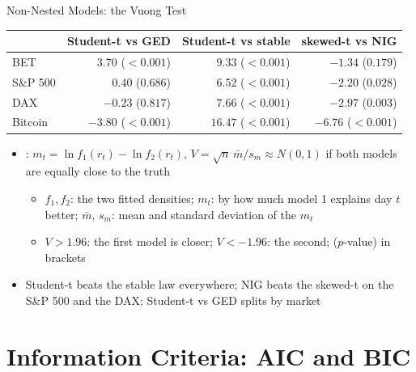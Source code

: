 \begin{frame}{Non-Nested Models: the Vuong Test}
\itemsize{\footnotesize}
\begin{center}
\footnotesize
\begin{tabular}{lrrr}
\toprule
& Student-t vs GED & Student-t vs stable & skewed-t vs NIG \\
\midrule
BET & $3.70$ ($<0.001$) & $9.33$ ($<0.001$) & $-1.34$ ($0.179$) \\
S\&P 500 & $0.40$ ($0.686$) & $6.52$ ($<0.001$) & $-2.20$ ($0.028$) \\
DAX & $-0.23$ ($0.817$) & $7.66$ ($<0.001$) & $-2.97$ ($0.003$) \\
Bitcoin & $-3.80$ ($<0.001$) & $16.47$ ($<0.001$) & $-6.76$ ($<0.001$) \\
\bottomrule
\end{tabular}
\end{center}
\begin{itemize}
    \item {}: $m_t = \ln f_1(r_t) - \ln f_2(r_t)$, $V = \sqrt{n}\,\bar m / s_m \approx N(0, 1)$ if both models are equally close to the truth
    \begin{itemize}
        \item $f_1, f_2$: the two fitted densities; $m_t$: by how much model 1 explains day $t$ better; $\bar m$, $s_m$: mean and standard deviation of the $m_t$
        \item $V > 1.96$: the first model is closer; $V < -1.96$: the second; ($p$-value) in brackets
    \end{itemize}
    \item Student-t beats the stable law everywhere; NIG beats the skewed-t on the S\&P 500 and the DAX; Student-t vs GED splits by market
\end{itemize}
\end{frame}


\section{Information Criteria: AIC and BIC}

